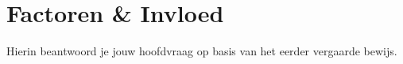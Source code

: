 \newpage
\section{Factoren & Invloed}
\label{sec:conc}

Hierin beantwoord je jouw hoofdvraag op basis van het eerder vergaarde bewijs.



